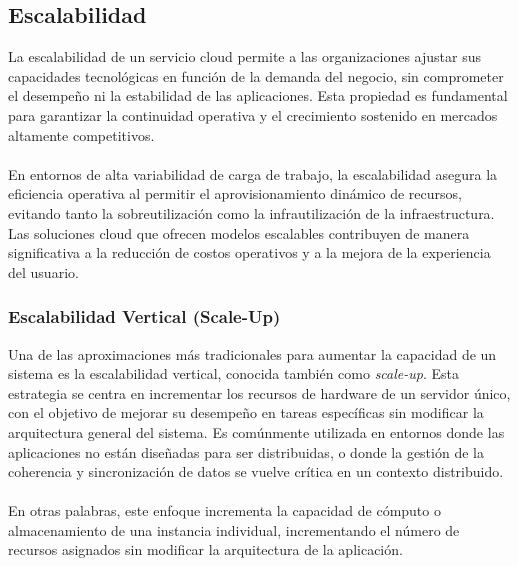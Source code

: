 {        \subsection{Escalabilidad}
                
            La escalabilidad de un servicio cloud permite a las organizaciones ajustar sus capacidades tecnológicas en función de la demanda del negocio, sin comprometer el desempeño ni la estabilidad de las aplicaciones. Esta propiedad es fundamental para garantizar la continuidad operativa y el crecimiento sostenido en mercados altamente competitivos.
                
            \paragraph{}En entornos de alta variabilidad de carga de trabajo, la escalabilidad asegura la eficiencia operativa al permitir el aprovisionamiento dinámico de recursos, evitando tanto la sobreutilización como la infrautilización de la infraestructura. Las soluciones cloud que ofrecen modelos escalables contribuyen de manera significativa a la reducción de costos operativos y a la mejora de la experiencia del usuario.
                
            \subsubsection{Escalabilidad Vertical (Scale-Up)}
                Una de las aproximaciones más tradicionales para aumentar la capacidad de un sistema es la escalabilidad vertical, conocida también como \textit{scale-up}. Esta estrategia se centra en incrementar los recursos de hardware de un servidor único, con el objetivo de mejorar su desempeño en tareas específicas sin modificar la arquitectura general del sistema. Es comúnmente utilizada en entornos donde las aplicaciones no están diseñadas para ser distribuidas, o donde la gestión de la coherencia y sincronización de datos se vuelve crítica en un contexto distribuido.
                
                \paragraph{}En otras palabras, este enfoque incrementa la capacidad de cómputo o almacenamiento de una instancia individual, incrementando el número de recursos asignados sin modificar la arquitectura de la aplicación.
                
}
